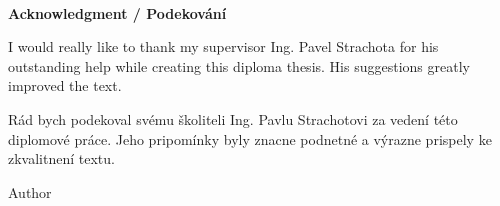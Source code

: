 \documentclass[a4paper,12pt]{report}	%
\begin{document}
\newpage
\thispagestyle{empty}

~
\vfill %

{\bf Acknowledgment / Podekování}

\vspace{5mm} %

I would really like to thank my supervisor Ing. Pavel Strachota for his outstanding help while creating this diploma thesis. His suggestions greatly improved the text.

Rád bych podekoval svému školiteli Ing. Pavlu Strachotovi za vedení této diplomové práce. Jeho pripomínky byly znacne podnetné a výrazne prispely ke zkvalitnení textu.

\begin{flushright}
Author
\end{flushright}

















\nocite{*}				%

\end{document}
